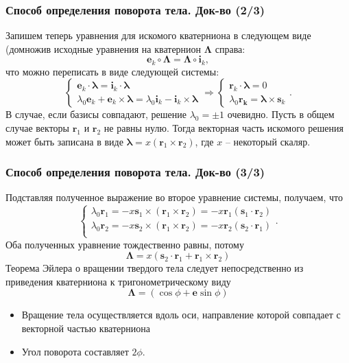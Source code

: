 \documentclass[utf8]{beamer}
\begin{document}
\begin{frame}
\frametitle{Способ определения поворота тела. Док-во (2/3)}    
Запишем теперь уравнения для искомого кватерниона в следующем виде (домножив
исходные уравнения на кватернион $\mathbf{\Lambda}$ справа:
$$
\mathbf{e}_k\circ\mathbf{\Lambda} = \mathbf{\Lambda}\circ\mathbf{i}_k,
$$
что можно переписать в виде следующей системы:
$$
\left\{
\begin{array}{l}
    \mathbf{e}_k\cdot\mathbf{\lambda} = \mathbf{i}_k\cdot\mathbf{\lambda} \\
    \lambda_0\mathbf{e}_k + \mathbf{e}_k\times\mathbf{\lambda} =
    \lambda_0\mathbf{i}_k - \mathbf{i}_k\times\mathbf{\lambda}
\end{array}
\right. \Rightarrow
\left\{
\begin{array}{l}
    \mathbf{r}_k\cdot\mathbf{\lambda} = 0 \\
    \lambda_0\mathbf{r_k} = \mathbf{\lambda}\times\mathbf{s}_k
\end{array}
\right. .
$$
В случае, если базисы совпадают, решение $\lambda_0=\pm 1$ очевидно. Пусть в
общем случае векторы $\mathbf{r}_1$ и $\mathbf{r}_2$ не равны нулю. Тогда
векторная часть искомого решения может быть записана в виде $\mathbf{\lambda}
= x\left(\mathbf{r}_1\times\mathbf{r}_2\right)$, где $x$ -- некоторый скаляр.
\end{frame}
\begin{frame}
\frametitle{Способ определения поворота тела. Док-во (3/3)}    
Подставляя полученное выражение во второе уравнение системы, получаем, что
$$
\left\{
\begin{array}{l}
    \lambda_0\mathbf{r}_1 =
    -x\mathbf{s}_1\times\left(\mathbf{r}_1\times\mathbf{r}_2\right)
    =-x\mathbf{r}_1\left(\mathbf{s}_1\cdot\mathbf{r}_2\right)\\
    \lambda_0\mathbf{r}_2 =
    -x\mathbf{s}_2\times\left(\mathbf{r}_1\times\mathbf{r}_2\right)
    =-x\mathbf{r}_2\left(\mathbf{s}_2\cdot\mathbf{r}_1\right)\\
\end{array}
\right. .
$$
Оба полученных уравнение тождественно равны, потому
$$
\mathbf{\Lambda} = x\left(\mathbf{s}_2\cdot\mathbf{r}_1 +
\mathbf{r}_1\times\mathbf{r}_2\right)
$$
Теорема Эйлера о вращении твердого тела следует непосредственно из приведения
кватерниона к тригонометрическому виду
$$
\mathbf{\Lambda}=\left(\cos{\phi}+\mathbf{e}\sin{\phi}\right)
$$
\begin{itemize}
\item Вращение тела осуществляется вдоль оси, направление которой совпадает с
    векторной частью кватерниона
\item Угол поворота составляет $2\phi$.
\end{itemize}
\end{frame}
\end{document}
